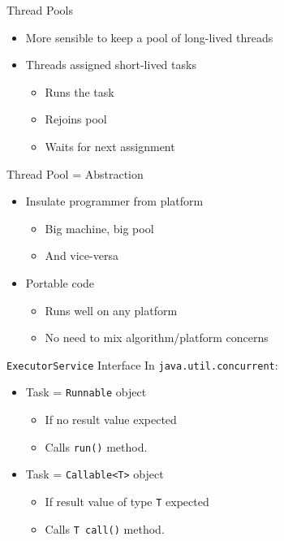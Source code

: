 \begin{frame}{Thread Pools}
  \begin{itemize}
  \item More sensible to keep a pool of long-lived threads
  \item Threads assigned short-lived tasks
    \begin{itemize}
    \item Runs the task
    \item Rejoins pool
    \item Waits for next assignment
    \end{itemize}
  \end{itemize}
\end{frame}

\begin{frame}{Thread Pool = Abstraction}
  \begin{itemize}
  \item Insulate programmer from platform
    \begin{itemize}
    \item Big machine, big pool
    \item And vice-versa 
    \end{itemize}
  \item Portable code
    \begin{itemize}
    \item Runs well on any platform
    \item No need to mix algorithm/platform concerns
    \end{itemize}
  \end{itemize}
\end{frame}

\begin{frame}{\lstinline!ExecutorService! Interface}
  In \lstinline!java.util.concurrent!:


  \begin{itemize}
  \item Task = \lstinline!Runnable! object
    \begin{itemize}
    \item If no result value expected
    \item Calls \lstinline!run()! method.
    \end{itemize}
  \item Task = \lstinline!Callable<T>! object
    \begin{itemize}
    \item If result value of type \lstinline!T! expected
    \item Calls \lstinline!T call()! method.
    \end{itemize}
  \end{itemize}
\end{frame}

